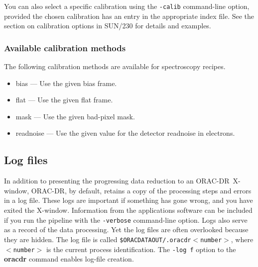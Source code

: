 \documentclass[twoside,11pt]{article}
\newenvironment{latexonly}{}{}
\newcommand{\xref}[3]{#1}
\newcommand{\xlabel}[1]{}
\renewcommand{\_}{\texttt{\symbol{95}}}
\newcommand{\ORACDR}{{\footnotesize ORAC-DR}}
\begin{document}
You can also select a specific calibration using the {\tt -calib}
command-line option, provided the chosen calibration has an entry
in the appropriate index file.  See
\begin{latexonly}
the section on
\end{latexonly}
\xref{calibration options}{sun230}{calibration_options}
\begin{latexonly}
in SUN/230
\end{latexonly}
for details and examples.

\subsubsection{\xlabel{available_calib}Available calibration methods\label{available_calib}}

The following calibration methods are available for spectroscopy
recipes.

\begin{itemize}

\item bias --- Use the given bias frame.

\item flat --- Use the given flat frame.

\item mask --- Use the given bad-pixel mask.

\item readnoise --- Use the given value for the detector readnoise
in electrons.

\end{itemize}

\subsection{\xlabel{log_files}Log files\label{log_files}}

In addition to presenting the progressing data reduction to an
\ORACDR\ X-window, \ORACDR, by default, retains a copy of the
processing steps and errors in a log file.  These logs are important
if something has gone wrong, and you have exited the X-window.
Information from the applications software can be included if you run
the pipeline with the {\tt -verbose} command-line option.  Logs also
serve as a record of the data processing.  Yet the log files are often
overlooked because they are hidden.  The log file is called
{\tt\$ORAC\_DATA\_OUT/.oracdr\_$<$number$>$}, where {\tt$<$number$>$}
is the current process identification.  The {\tt -log f} option to the
{\bf oracdr} command enables log-file creation.
\end{document}
